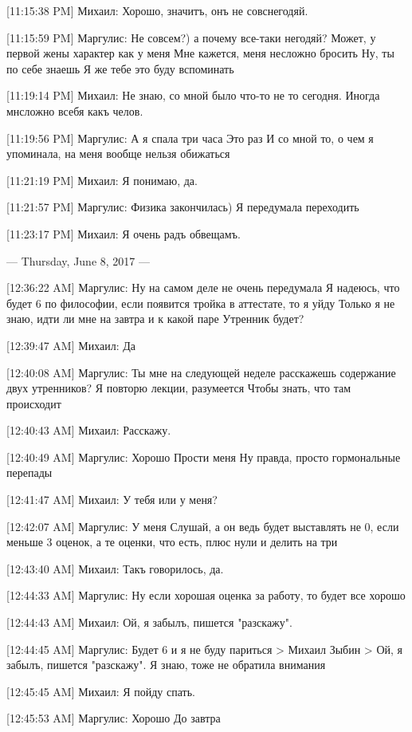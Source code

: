\documentclass{article}
\newcommand{\yat}{{\fontencoding{X2}\selectfont\cyryat}} %
\begin{document}
[11:15:38 PM] Михаил:
Хорошо, значитъ, онъ не совс негодяй.

[11:15:59 PM] Маргулис:
Не совсем?) а почему все-таки негодяй?
 Может, у первой жены характер как у меня
 Мне кажется, меня несложно бросить
 Ну, ты по себе знаешь
 Я же тебе это буду вспоминать

[11:19:14 PM] Михаил:
Не знаю, со мной было что-то не то сегодня.
 Иногда мн\yat сложно в себя какъ челов.

[11:19:56 PM] Маргулис:
А я спала три часа
 Это раз
 И со мной то, о чем я упоминала, на меня вообще нельзя обижаться

[11:21:19 PM] Михаил:
Я понимаю, да.

[11:21:57 PM] Маргулис:
Физика закончилась)
 Я передумала переходить

[11:23:17 PM] Михаил:
Я очень радъ об вещамъ.

--- Thursday, June 8, 2017 ---

[12:36:22 AM] Маргулис:
Ну на самом деле не очень передумала
 Я надеюсь, что будет 6 по философии, если появится тройка в аттестате, то я уйду
 Только я не знаю, идти ли мне на завтра и к какой паре
 Утренник будет?

[12:39:47 AM] Михаил:
Да

[12:40:08 AM] Маргулис:
Ты мне на следующей неделе расскажешь содержание двух утренников?
 Я повторю лекции, разумеется
 Чтобы знать, что там происходит

[12:40:43 AM] Михаил:
Расскажу.

[12:40:49 AM] Маргулис:
Хорошо
 Прости меня
 Ну правда, просто гормональные перепады

[12:41:47 AM] Михаил:
У тебя или у меня?

[12:42:07 AM] Маргулис:
У меня
 Слушай, а он ведь будет выставлять не 0, если меньше 3 оценок, а те оценки, что есть, плюс нули и делить на три

[12:43:40 AM] Михаил:
Такъ говорилось, да.

[12:44:33 AM] Маргулис:
Ну если хорошая оценка за работу, то будет все хорошо

[12:44:43 AM] Михаил:
Ой, я забылъ, пишется "разскажу".

[12:44:45 AM] Маргулис:
Будет 6 и я не буду париться
> Михаил Зыбин
> Ой, я забылъ, пишется "разскажу".
Я знаю, тоже не обратила внимания

[12:45:45 AM] Михаил:
Я пойду спать.

[12:45:53 AM] Маргулис:
Хорошо
 До завтра
\end{document}
